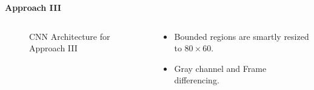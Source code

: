 \begin{frame}{\textbf{Approach III}}
\begin{columns}
	\begin{column}{0.6\textwidth}
	\begin{figure}
		\centering
		\caption{CNN Architecture for Approach III}
	\end{figure}
	\end{column}
	\begin{column}{0.4\textwidth}
		\begin{itemize}
			\item Bounded regions are smartly resized to $80 \times 60$.
			\item Gray channel and Frame differencing.
		\end{itemize}
	\end{column}
\end{columns}
\end{frame}

